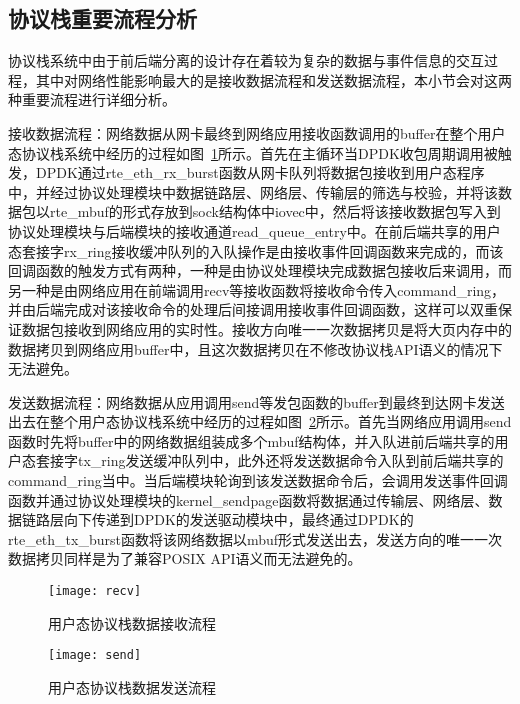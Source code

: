\subsection{协议栈重要流程分析} %

协议栈系统中由于前后端分离的设计存在着较为复杂的数据与事件信息的交互过程，其中对网络性能影响最大的是接收数据流程和发送数据流程，本小节会对这两种重要流程进行详细分析。

接收数据流程：网络数据从网卡最终到网络应用接收函数调用的buffer在整个用户态协议栈系统中经历的过程如图~\ref{fig:recv}所示。首先在主循环当DPDK收包周期调用被触发，DPDK通过rte\_eth\_rx\_burst函数从网卡队列将数据包接收到用户态程序中，并经过协议处理模块中数据链路层、网络层、传输层的筛选与校验，并将该数据包以rte\_mbuf的形式存放到sock结构体中iovec中，然后将该接收数据包写入到协议处理模块与后端模块的接收通道read\_queue\_entry中。在前后端共享的用户态套接字rx\_ring接收缓冲队列的入队操作是由接收事件回调函数来完成的，而该回调函数的触发方式有两种，一种是由协议处理模块完成数据包接收后来调用，而另一种是由网络应用在前端调用recv等接收函数将接收命令传入command\_ring，并由后端完成对该接收命令的处理后间接调用接收事件回调函数，这样可以双重保证数据包接收到网络应用的实时性。接收方向唯一一次数据拷贝是将大页内存中的数据拷贝到网络应用buffer中，且这次数据拷贝在不修改协议栈API语义的情况下无法避免。

发送数据流程：网络数据从应用调用send等发包函数的buffer到最终到达网卡发送出去在整个用户态协议栈系统中经历的过程如图~\ref{fig:send}所示。首先当网络应用调用send函数时先将buffer中的网络数据组装成多个mbuf结构体，并入队进前后端共享的用户态套接字tx\_ring发送缓冲队列中，此外还将发送数据命令入队到前后端共享的command\_ring当中。当后端模块轮询到该发送数据命令后，会调用发送事件回调函数并通过协议处理模块的kernel\_sendpage函数将数据通过传输层、网络层、数据链路层向下传递到DPDK的发送驱动模块中，最终通过DPDK的rte\_eth\_tx\_burst函数将该网络数据以mbuf形式发送出去，发送方向的唯一一次数据拷贝同样是为了兼容POSIX API语义而无法避免的。

\vspace{-10pt}
\begin{figure}[H] %
  \centering
  \texttt{[image: recv]}
  \caption{用户态协议栈数据接收流程}
  \label{fig:recv}
\end{figure}
\vspace{-10pt}

\vspace{-10pt}
\begin{figure}[H] %
  \centering
  \texttt{[image: send]}
  \caption{用户态协议栈数据发送流程}
  \label{fig:send}
\end{figure}
\vspace{-10pt}